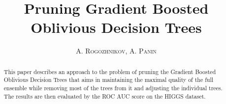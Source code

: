\documentclass[twoside]{article}
\title{\vspace{-15mm}\fontsize{24pt}{10pt}\selectfont\textbf{Pruning Gradient Boosted Oblivious Decision Trees}} %
\author{
\large
\textsc{A. Rogozhnikov, A. Panin}
\vspace{-5mm}
}
\date{}
\begin{document}
\maketitle %

\thispagestyle{fancy} %


\begin{abstract}

\noindent This paper describes an approach to the problem of pruning the Gradient Boosted Oblivious Decision Trees that aims in maintaining the maximal quality of the full ensemble while removing most of the trees from it and adjusting the individual trees. The results are then evaluated by the ROC AUC score on the HIGGS dataset.

\end{abstract}

\end{document}
